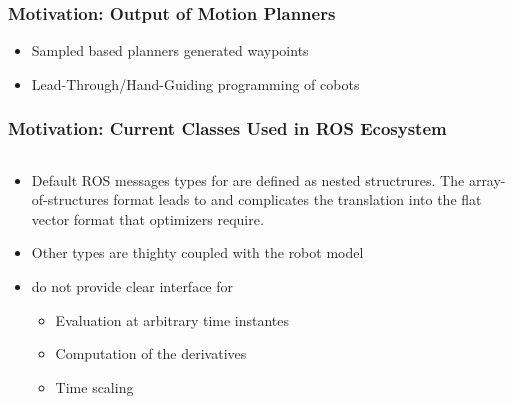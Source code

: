 \begin{frame}[t]
	\frametitle{Motivation: Output of Motion Planners}
	\begin{itemize}
		\item Sampled based planners generated waypoints
		\item Lead-Through/Hand-Guiding programming of cobots
	\end{itemize}
\end{frame}

\begin{frame}[fragile]
	\frametitle{Motivation: Current Classes Used in ROS Ecosystem}
	\begin{columns}
		\begin{column}{0.5\textwidth}
			\begin{itemize}
				\item Default ROS messages types for are defined as nested structrures.
				      The array-of-structures format leads to  and complicates the translation into the flat vector format that optimizers require.
				\item Other types are thighty coupled with the robot model
				\item do not provide clear interface for
				      \begin{itemize}
					      \item Evaluation at arbitrary time instantes
					      \item Computation of the derivatives
					      \item Time scaling
				      \end{itemize}
			\end{itemize}


\end{column}
\end{columns}
\end{frame}
